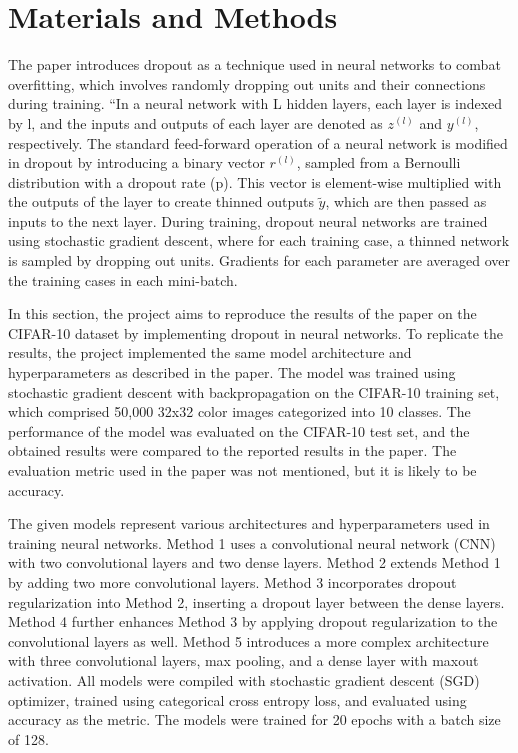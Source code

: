 \documentclass{article}
\begin{document}
\section{Materials and Methods}
The paper introduces dropout as a technique used in neural networks to combat overfitting, which involves randomly dropping out units and their connections during training. “In a neural network with L hidden layers, each layer is indexed by l, and the inputs and outputs of each layer are denoted as $z^{(l)}$ and $y^{(l)}$, respectively. The standard feed-forward operation of a neural network is modified in dropout by introducing a binary vector $r^{(l)}$, sampled from a Bernoulli distribution with a dropout rate (p). This vector is element-wise multiplied with the outputs of the layer to create thinned outputs $\tilde{y}$, which are then passed as inputs to the next layer. During training, dropout neural networks are trained using stochastic gradient descent, where for each training case, a thinned network is sampled by dropping out units. Gradients for each parameter are averaged over the training cases in each mini-batch. 

In this section, the project aims to reproduce the results of the paper on the CIFAR-10 dataset by implementing dropout in neural networks. To replicate the results, the project implemented the same model architecture and hyperparameters as described in the paper. The model was trained using stochastic gradient descent with backpropagation on the CIFAR-10 training set, which comprised 50,000 32x32 color images categorized into 10 classes. The performance of the model was evaluated on the CIFAR-10 test set, and the obtained results were compared to the reported results in the paper. The evaluation metric used in the paper was not mentioned, but it is likely to be accuracy. 

The given models represent various architectures and hyperparameters used in training neural networks. Method 1 uses a convolutional neural network (CNN) with two convolutional layers and two dense layers. Method 2 extends Method 1 by adding two more convolutional layers. Method 3 incorporates dropout regularization into Method 2, inserting a dropout layer between the dense layers. Method 4 further enhances Method 3 by applying dropout regularization to the convolutional layers as well. Method 5 introduces a more complex architecture with three convolutional layers, max pooling, and a dense layer with maxout activation. All models were compiled with stochastic gradient descent (SGD) optimizer, trained using categorical cross entropy loss, and evaluated using accuracy as the metric. The models were trained for 20 epochs with a batch size of 128.
\end{document}
